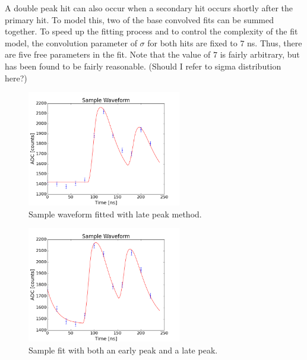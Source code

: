A double peak hit can also occur when a secondary hit occurs shortly after the primary hit. To model this, two of the base convolved fits can be summed together. To speed up the fitting process and to control the complexity of the fit model, the convolution parameter of $\sigma$ for both hits are fixed to $7$ ns. Thus, there are five free parameters in the fit. Note that the value of $7$ is fairly arbitrary, but has been found to be fairly reasonable. (Should I refer to sigma distribution here?)







\begin{figure}[htp!]
    \centering
    \includegraphics[width=0.6\textwidth]{Images2/double.png}
    \caption{Sample waveform fitted with late peak method.}
\end{figure} 

\begin{figure}[htp!]
    \centering
    \includegraphics[width=0.6\textwidth]{Images2/full.png}
    \caption{Sample fit with both an early peak and a late peak.}
    \label{fig:full}
\end{figure} 

